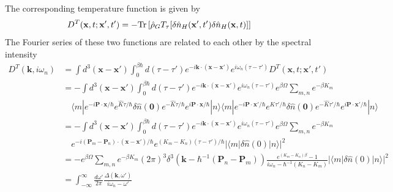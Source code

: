  The corresponding temperature function is given by 
\begin{equation}
D^T(\mathbf x,t;\mathbf x',t')=-\text{Tr}\left[ \hat \rho_GT_\tau[\delta \hat n_H(\mathbf x',t')\delta\hat n_H(\mathbf x,t)] \right]
\end{equation}
 The Fourier series of these two functions are related to each other by the spectral intensity
\begin{equation}
\begin{aligned}
D^T(\mathbf k,i\omega_n)&=\int d^3(\mathbf x-\mathbf x')\int _0^{\beta\hbar}d(\tau-\tau')e^{-i\mathbf k\cdot(\mathbf x-\mathbf x')}e^{i\omega_n (\tau-\tau')}D^T(\mathbf x,t;\mathbf x',t')\\
&=-\int d^3(\mathbf x-\mathbf x')\int _0^{\beta\hbar}d(\tau-\tau')e^{-i\mathbf k\cdot(\mathbf x-\mathbf x')}e^{i\omega_n (\tau-\tau')} e^{\beta\Omega} \sum_{m,n} e^{-\beta K_m}\\
&\quad\langle m|e^{-i\mathbf P\cdot \mathbf x/\hbar} e^{\hat K \tau/\hbar} \delta \hat n(\mathbf 0) e^{-\hat K \tau/\hbar} e^{i\mathbf P\cdot \mathbf x/\hbar} |n\rangle \langle m|e^{-i\mathbf P\cdot \mathbf x'/\hbar} e^{\hat K \tau'/\hbar} \delta \hat n(\mathbf 0) e^{-\hat K \tau'/\hbar} e^{i\mathbf P\cdot \mathbf x'/\hbar} |n\rangle\\ 
&=-\int d^3(\mathbf x-\mathbf x')\int _0^{\beta\hbar}d(\tau-\tau')e^{-i\mathbf k\cdot(\mathbf x-\mathbf x')}e^{i\omega_n (\tau-\tau')} e^{\beta\Omega} \sum_{m,n}e^{-\beta K_m}\\
&\quad e^{-i(\mathbf P_m-\mathbf P_n)\cdot(\mathbf x-\mathbf x')/\hbar} e^{(K_m-K_n)(\tau-\tau')/\hbar} |\langle m|\delta\hat n(0)|n\rangle|^2\\
&=-e^{\beta\Omega} \sum_{m,n} e^{-\beta K_m} (2\pi)^3 \delta^3(\mathbf k-\hbar^{-1}(\mathbf P_n-\mathbf P_m))\frac{e^{(K_m-K_n)\beta}-1}{i\omega_n-\hbar^{-1}(K_n-K_m)}|\langle m|\delta \hat n(0)|n\rangle|^2\\
&=\int_{-\infty}^{\infty}\frac{d\omega'}{2\pi}\frac{\Delta(\mathbf k,\omega')}{i\omega_n-\omega'}
\end{aligned}
\end{equation}

